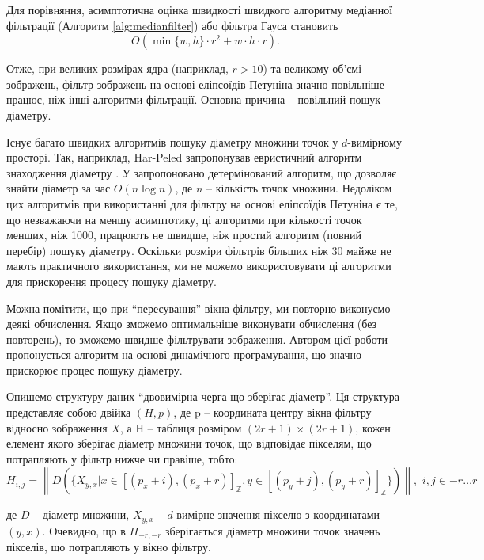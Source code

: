 Для порівняння, асимптотична оцінка швидкості швидкого алгоритму медіанної фільтрації (Алгоритм \ref{alg:medianfilter}) або фільтра Гауса становить
\begin{equation*}
O\left(
\min\{w, h\} \cdot r^2 + w \cdot h \cdot r
\right).
\end{equation*}

Отже, при великих розмірах ядра (наприклад, \(r > 10\)) та великому об'ємі зображень, фільтр зображень на основі еліпсоїдів Петуніна значно повільніше працює, ніж інші алгоритми фільтрації. Основна причина -- повільний пошук діаметру. 

Існує багато швидких алгоритмів пошуку діаметру множини точок у \(d\)-вимірному просторі. Так, наприклад, Har-Peled запропонував евристичний алгоритм знаходження діаметру \citep{bib:harpeled}. У \citep{bib:diamset} запропоновано детермінований алгоритм, що дозволяє знайти діаметр за час \(O\left( n \log n \right)\), де \(n\) -- кількість точок множини. Недоліком цих алгоритмів при використанні для фільтру на основі еліпсоїдів Петуніна є те, що незважаючи на меншу асимптотику, ці алгоритми при кількості точок менших, ніж 1000, працюють не швидше, ніж простий алгоритм (повний перебір) пошуку діаметру. Оскільки розміри фільтрів більших ніж 30 майже не мають практичного використання, ми не можемо використовувати ці алгоритми для прискорення процесу пошуку діаметру.

Можна помітити, що при \enquote{пересування} вікна фільтру, ми повторно виконуємо деякі обчислення. Якщо зможемо оптимальніше виконувати обчислення (без повторень), то зможемо швидше фільтрувати зображення. Автором цієї роботи пропонується алгоритм на основі динамічного програмування, що значно прискорює процес пошуку діаметру.

Опишемо структуру даних \enquote{двовимірна черга що зберігає діаметр}. Ця структура представляє собою двійка \(\left(H, p\right)\), де p -- координата центру вікна фільтру відносно зображення \(X\), а H -- таблиця розміром \((2r + 1) \times (2r + 1)\), кожен елемент якого зберігає діаметр множини точок, що відповідає пікселям, що потрапляють у фільтр нижче чи правіше, тобто:
\begin{equation}
\label{eq:queueinit}
H_{i, j} = \left\| D(\{ X_{y, x} \big| x \in [(p_x + i), (p_x + r)]_{\mathbb{Z}}, y \in [(p_y + j), (p_y + r)]_\mathbb{Z} \}) \right\|,\,\, i, j \in -r \dots r
\end{equation}

\par
де \(D\) -- діаметр множини, \(X_{y, x}\) -- \(d\)-вимірне значення пікселю з координатами \((y, x)\). Очевидно, що в \(H_{-r, -r}\) зберігається діаметр множини точок значень пікселів, що потрапляють у вікно фільтру. 


